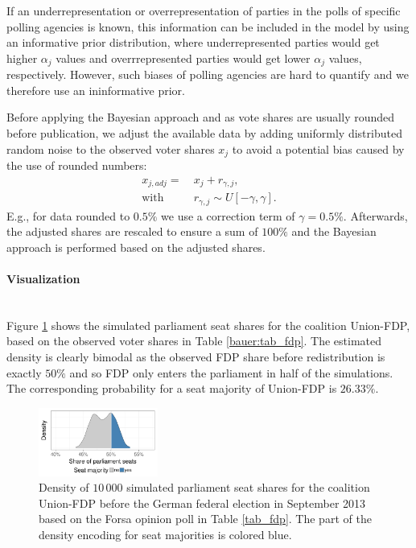 \documentclass[smallcondensed]{svjour3}     %
\begin{document}
If an underrepresentation or overrepresentation of parties
in the polls of specific polling agencies is known, this information
can be included in the model by using an informative prior distribution,
where underrepresented parties would get higher $\alpha_j$ values and
overrrepresented parties would get lower $\alpha_j$ values, respectively.
However, such biases of polling agencies are hard to quantify
and we therefore use an ininformative prior.

Before applying the Bayesian approach and as vote shares are usually rounded
before publication, we adjust the available data by adding uniformly distributed
random noise to the
observed voter shares $x_j$ to avoid a potential bias caused by the use of
rounded numbers:
\begin{equation}
\begin{aligned}
x_{j,adj} = \ &x_j + r_{\gamma,j}, \\
\text{with} \ \ \ \ \ &r_{\gamma,j} \sim U[-\gamma,\gamma].
\end{aligned}
\end{equation}
E.g., for data rounded to $0.5\%$ we use a correction term of $\gamma = 0.5\%$. Afterwards, the adjusted shares are rescaled to ensure a sum of $100\%$ and the Bayesian approach is performed based on the adjusted shares.


\paragraph{Visualization} \ \\
Figure \ref{fig:seatDist} shows the simulated
parliament seat shares for the coalition Union-FDP, based on the observed
voter shares in Table \ref{bauer:tab_fdp}. The estimated density is clearly bimodal
as the observed FDP share before redistribution is exactly $50\%$ and
so FDP only enters the parliament in half of the simulations. The corresponding
probability for a seat majority of Union-FDP is $26.33\%$.

\begin{figure}[H]\centering
\includegraphics[width=0.35\textwidth]{figures/2013_forsa_cdufdp_lastPreelectionPoll.pdf}
\caption{Density of $10\,000$ simulated parliament seat shares for the coalition Union-FDP before the German federal election in September 2013 based on the Forsa opinion poll in Table \ref{tab_fdp}. The part of the density encoding for seat majorities is colored blue.
\label{fig:seatDist}
}
\end{figure}
\end{document}
